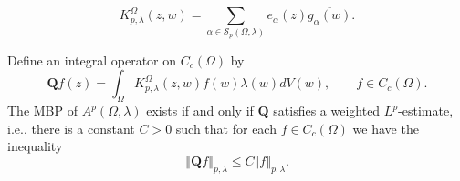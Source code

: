 \documentclass[10pt,a4paper]{amsart}
\newcommand{\cs}{{\mathcal S}}
\newcommand{\norm}[1]{\left\Vert#1\right\Vert}
\newcommand{\ol}{\overline}
\begin{document}
\begin{equation}\label{eq-kgalpha}
K_{p,\lambda}^\Omega(z,w)=\sum_{\alpha\in \cs_p(\Omega, \lambda)}e_\alpha(z) \ol{g_\alpha(w)}. 
\end{equation}

\begin{proposition}\label{prop:MBP-is-a-basis-projection}
Define an integral operator on $C_c(\Omega)$ by
\begin{equation}\label{eq-qdef}
\bm{Q}f(z) = \int_\Omega  K_{p,\lambda}^\Omega(z,w) f(w)\lambda(w) dV(w), \qquad f\in C_c(\Omega).
\end{equation}
The MBP of $A^p(\Omega,\lambda)$ exists if and only if $\bm{Q}$ satisfies a weighted $L^p$-estimate, i.e., there is a constant $C>0$ such that for each $f\in C_c(\Omega)$ we have the inequality
\begin{equation}\label{eq-lpest}
\norm{\bm{Q} f}_{p,\lambda}\leq C \norm{f}_{p,\lambda}.
\end{equation}
\end{proposition}
\end{document}
